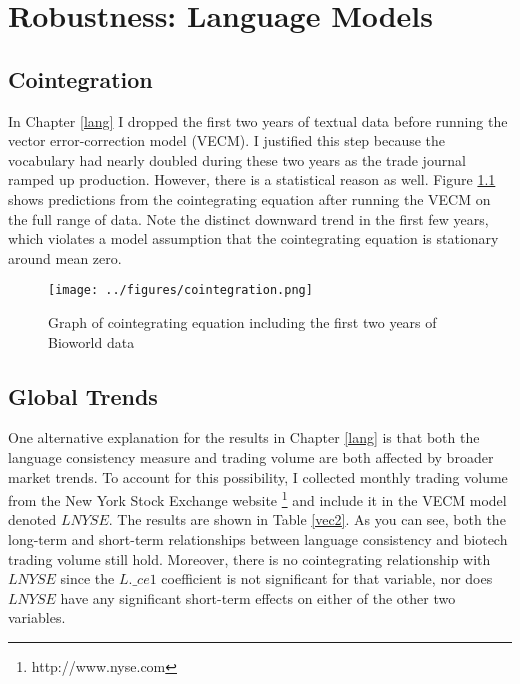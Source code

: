 \chapter{Robustness: Language Models\label{apndxA}}

\section{Cointegration}

In Chapter \ref{lang} I dropped the first two years of textual data before running the vector error-correction model (VECM). I justified this step because the vocabulary had nearly doubled during these two years as the trade journal ramped up production. However, there is a statistical reason as well. Figure \ref{coint} shows predictions from the cointegrating equation after running the VECM on the full range of data. Note the distinct downward trend in the first few years, which violates a model assumption that the cointegrating equation is stationary around mean zero.

\begin{figure}
\begin{center}
\texttt{[image: ../figures/cointegration.png]}
\caption[Graph of cointegrating equation]{Graph of cointegrating equation including the first two years of Bioworld data \label{coint}}
\end{center}
\end{figure}

\section{Global Trends}

One alternative explanation for the results in Chapter \ref{lang} is that both the language consistency measure and trading volume are both affected by broader market trends. To account for this possibility, I collected monthly trading volume from the New York Stock Exchange website \footnote{http://www.nyse.com} and include it in the VECM model denoted $LNYSE$. The results are shown in Table \ref{vec2}. As you can see, both the long-term and short-term relationships between language consistency and biotech trading volume still hold. Moreover, there is no cointegrating relationship with $LNYSE$ since the $L.\_ce1$ coefficient is not significant for that variable, nor does $LNYSE$ have any significant short-term effects on either of the other two variables. 

